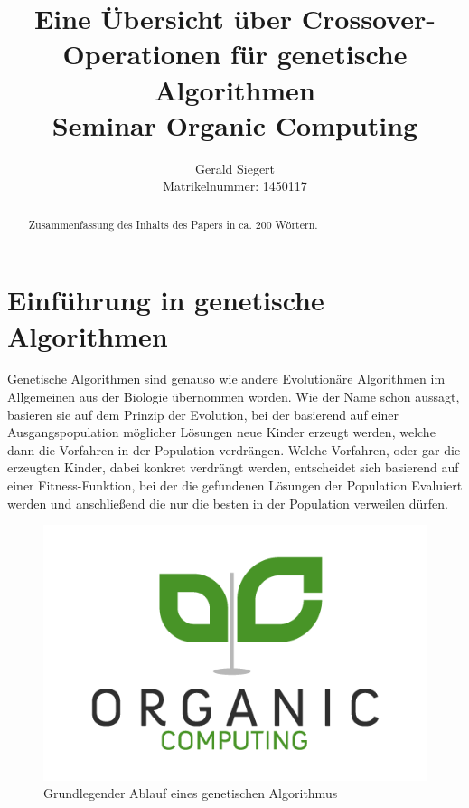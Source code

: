 \documentclass{llncs}
\begin{document}
\mainmatter

\title{Eine Übersicht über Crossover-Operationen für genetische Algorithmen\\Seminar Organic Computing}

\author{Gerald Siegert\\Matrikelnummer: 1450117}
\tocauthor{}


\maketitle


\begin{abstract}
	Zusammenfassung des Inhalts des Papers in ca. 200 Wörtern.
\end{abstract}

\pagebreak

\section{Einführung in genetische Algorithmen}
\label{sec:EinfuhrungGA}

	Genetische Algorithmen sind genauso wie andere Evolutionäre Algorithmen im Allgemeinen aus der Biologie übernommen worden. Wie der Name schon aussagt, basieren sie auf dem Prinzip der Evolution, bei der basierend auf einer Ausgangspopulation möglicher Lösungen neue Kinder erzeugt werden, welche dann die Vorfahren in der Population verdrängen. Welche Vorfahren, oder gar die erzeugten Kinder, dabei konkret verdrängt werden, entscheidet sich basierend auf einer Fitness-Funktion, bei der die gefundenen Lösungen der Population Evaluiert werden und anschließend die nur die besten in der Population verweilen dürfen.
	
	\begin{figure}
		\centering
		\includegraphics[width=.8\columnwidth]{./Figures/Organic-Computing.png}
		\caption{Grundlegender Ablauf eines genetischen Algorithmus}
		\label{fig:abb1}
	\end{figure}
	
\end{document}
